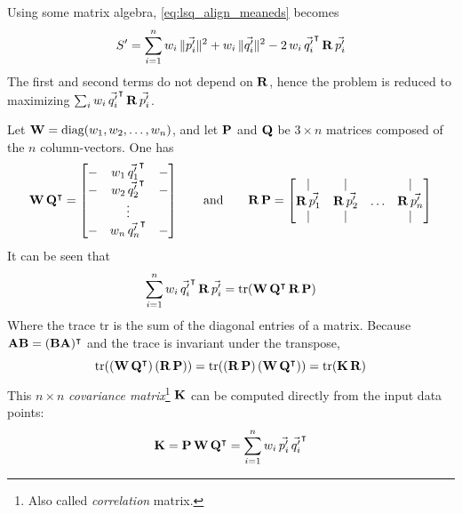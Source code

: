 Using some matrix algebra, \ref{eq:lsq_align_meaneds} becomes
\begin{equation}
S' = \sum_{i=1}^{n} w_i \, \| \vec{p'_i} \|^2 + w_i \, \| \vec{q'_i} \|^2 - 2 \, w_i \, \vec{q'_i}^\intercal \, \mathbf{R} \, \vec{p'_i}
\end{equation}
The first and second terms do not depend on $\mathbf{R}$, hence the problem is reduced to maximizing $\sum_{i} w_i \, \vec{q'_i}^\intercal \, \mathbf{R} \, \vec{p'_i}$.

Let $\mathbf{W} = \text{diag}(w_1, w_2, \dots, w_n)$, and let $\mathbf{P}$ and $\mathbf{Q}$ be $3 \times n$ matrices composed of the $n$ column-vectors. One has
\begin{equation}
\mathbf{W} \, \mathbf{Q}^\intercal = \left[ \begin{matrix}
	\-- & w_1 \, \vec{q'_1}^\intercal & \--\\
	\-- & w_2 \, \vec{q'_2}^\intercal & \--\\
	& \vdots & \\
	\-- & w_n \, \vec{q'_n}^\intercal & \--
\end{matrix} \right]
\hspace{7mm} \text{and} \hspace{7mm}
\mathbf{R} \, \mathbf{P} = \left[ \begin{matrix}
	| & | & & |\\
	\mathbf{R} \, \vec{p'_1} & \mathbf{R} \, \vec{p'_2} & \hdots & \mathbf{R} \, \vec{p'_n}\\
	| & | & & |
\end{matrix} \right]
\end{equation}
It can be seen that
\begin{equation}
\sum_{i=1}^{n} w_i \, \vec{q'_i}^\intercal \, \mathbf{R} \, \vec{p'_i} = \text{tr}(\mathbf{W} \, \mathbf{Q}^\intercal \, \mathbf{R} \, \mathbf{P})
\end{equation}
Where the trace $\text{tr}$ is the sum of the diagonal entries of a matrix. Because $\mathbf{A} \mathbf{B} = (\mathbf{B} \mathbf{A})^\intercal$ and the trace is invariant under the transpose,
\begin{equation}
\text{tr}((\mathbf{W} \, \mathbf{Q}^\intercal) \, (\mathbf{R} \, \mathbf{P})) = \text{tr}((\mathbf{R} \, \mathbf{P}) \, (\mathbf{W} \, \mathbf{Q}^\intercal)) = \text{tr}(\mathbf{K} \, \mathbf{R})
\end{equation}
This $n \times n$ \emph{covariance matrix}\footnote{Also called \emph{correlation} matrix.} $\mathbf{K}$ can be computed directly from the input data points:
\begin{equation}
\mathbf{K} = \mathbf{P} \, \mathbf{W} \, \mathbf{Q}^\intercal = \sum_{i=1}^{n} w_i \, \vec{p'_i} \, \vec{q'_i}^\intercal
\end{equation}


